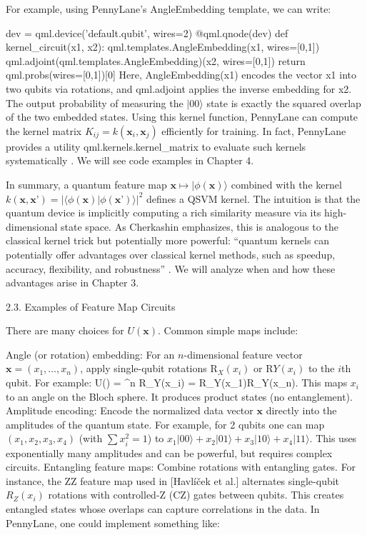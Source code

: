 For example, using PennyLane’s AngleEmbedding template, we can write:

dev = qml.device('default.qubit', wires=2)
@qml.qnode(dev)
def kernel_circuit(x1, x2):
    qml.templates.AngleEmbedding(x1, wires=[0,1])
    qml.adjoint(qml.templates.AngleEmbedding)(x2, wires=[0,1])
    return qml.probs(wires=[0,1])[0]
Here, AngleEmbedding(x1) encodes the vector x1 into two qubits via rotations, and qml.adjoint applies the inverse embedding for x2.  The output probability of measuring the $|00\rangle$ state is exactly the squared overlap of the two embedded states.  Using this kernel function, PennyLane can compute the kernel matrix $K_{ij}=k(\mathbf{x}_i,\mathbf{x}_j)$ efficiently for training.  In fact, PennyLane provides a utility qml.kernels.kernel_matrix to evaluate such kernels systematically .  We will see code examples in Chapter 4.



In summary, a quantum feature map $\mathbf{x}\mapsto|\phi(\mathbf{x})\rangle$ combined with the kernel $k(\mathbf{x},\mathbf{x}’)=|\langle\phi(\mathbf{x})|\phi(\mathbf{x}’)\rangle|^2$ defines a QSVM kernel.  The intuition is that the quantum device is implicitly computing a rich similarity measure via its high-dimensional state space.  As Cherkashin emphasizes, this is analogous to the classical kernel trick but potentially more powerful: “quantum kernels can potentially offer advantages over classical kernel methods, such as speedup, accuracy, flexibility, and robustness” .  We will analyze when and how these advantages arise in Chapter 3.





2.3. Examples of Feature Map Circuits





There are many choices for $U(\mathbf{x})$.  Common simple maps include:



Angle (or rotation) embedding: For an $n$-dimensional feature vector $\mathbf{x}=(x_1,\dots,x_n)$, apply single-qubit rotations $\mathrm{R}_X(x_i)$ or $\mathrm{R}Y(x_i)$ to the $i$th qubit.  For example:
U() \;=\; ^n R_Y(x_i) \;=\; R_Y(x_1)\otimes \cdots \otimes R_Y(x_n).
This maps $x_i$ to an angle on the Bloch sphere.  It produces product states (no entanglement).
Amplitude encoding: Encode the normalized data vector $\mathbf{x}$ directly into the amplitudes of the quantum state.  For example, for 2 qubits one can map $(x_1,x_2,x_3,x_4)$ (with $\sum x_i^2=1$) to $x_1|00\rangle + x_2|01\rangle + x_3|10\rangle + x_4|11\rangle$.  This uses exponentially many amplitudes and can be powerful, but requires complex circuits.
Entangling feature maps: Combine rotations with entangling gates.  For instance, the ZZ feature map used in [Havlíček et al.] alternates single-qubit $R_Z(x_i)$ rotations with controlled-Z (CZ) gates between qubits.  This creates entangled states whose overlaps can capture correlations in the data.  In PennyLane, one could implement something like:


